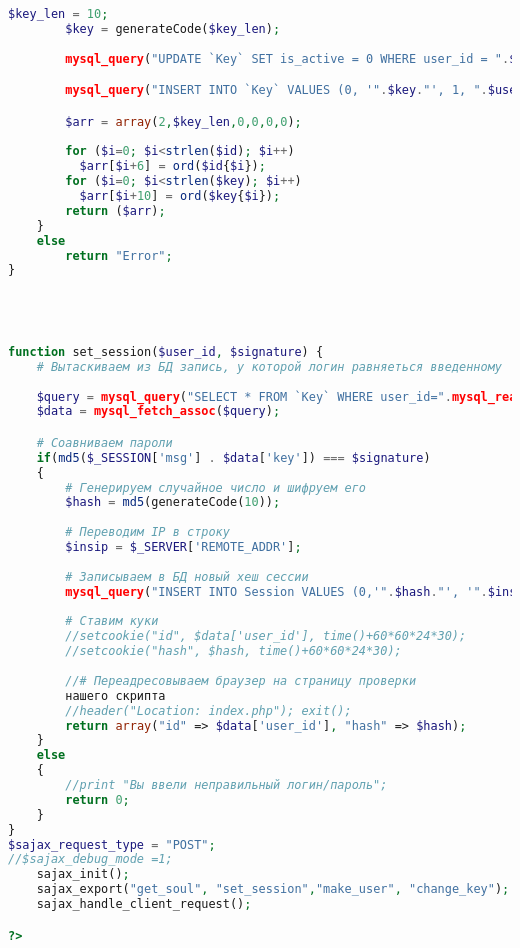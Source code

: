 {\begin{lstlisting}[language=PHP]
		$key_len = 10;
		$key = generateCode($key_len);
		
		mysql_query("UPDATE `Key` SET is_active = 0 WHERE user_id = ".$user_id);

		mysql_query("INSERT INTO `Key` VALUES (0, '".$key."', 1, ".$user_id.")");

		$arr = array(2,$key_len,0,0,0,0);
		
		for ($i=0; $i<strlen($id); $i++)
		  $arr[$i+6] = ord($id{$i});
		for ($i=0; $i<strlen($key); $i++)
		  $arr[$i+10] = ord($key{$i});
		return ($arr);
	}
	else 
		return "Error";
}




function set_session($user_id, $signature) {
	# Вытаскиваем из БД запись, у которой логин	равняеться введенному 
    
    $query = mysql_query("SELECT * FROM `Key` WHERE user_id=".mysql_real_escape_string(0+$user_id)." and is_active=1 LIMIT 1");
    $data = mysql_fetch_assoc($query); 

    # Соавниваем пароли 
    if(md5($_SESSION['msg'] . $data['key']) === $signature)
    { 
        # Генерируем случайное число и шифруем его 
        $hash = md5(generateCode(10)); 
              
        # Переводим IP в строку 
        $insip = $_SERVER['REMOTE_ADDR']; 
                 
        # Записываем в БД новый хеш сессии 
        mysql_query("INSERT INTO Session VALUES (0,'".$hash."', '".$insip."', ".$data[user_id].")");
         
        # Ставим куки 
        //setcookie("id", $data['user_id'], time()+60*60*24*30); 
        //setcookie("hash", $hash, time()+60*60*24*30); 
         
        //# Переадресовываем браузер на страницу проверки 
        нашего скрипта 
        //header("Location: index.php"); exit(); 
		return array("id" => $data['user_id'], "hash" => $hash);
    } 
    else 
    { 
        //print "Вы ввели неправильный логин/пароль"; 
		return 0;
    } 
}
$sajax_request_type = "POST";
//$sajax_debug_mode =1;
	sajax_init();
	sajax_export("get_soul", "set_session","make_user", "change_key");
	sajax_handle_client_request();	

?>
\end{lstlisting}}